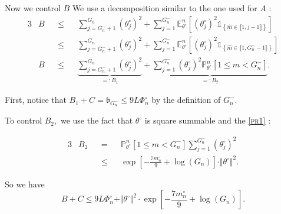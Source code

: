 Now we control $B$ We use a decomposition similar to the one used for $A$ :
\begin{alignat*}{3}
& B && \leq && \sum\limits_{j = G_{n}^{-} + 1}^{G_{n}} \left(\theta^{\circ}_{j}\right)^{2} + \sum\limits_{j = 1}^{G_{n}^{-}} \mathds{E}_{\theta^{\circ}}^{n}\left[\left(\theta^{\circ}_{j}\right)^{2} \mathds{1}_{\left\{\widehat{m} \in \llbracket 1, j - 1 \rrbracket\right\}}\right]\\
& && \leq && \sum\limits_{j = G_{n}^{-} + 1}^{G_{n}} \left(\theta^{\circ}_{j} \right)^{2} + \sum\limits_{j = 1}^{G_{n}^{-}} \mathds{E}_{\theta^{\circ}}^{n}\left[\left(\theta^{\circ}_{j}\right)^{2} \mathds{1}_{\left\{\widehat{m} \in \llbracket 1, G_{n}^{-} - 1 \rrbracket\right\}}\right]\\
& B && \leq && \underbrace{\sum\limits_{j = G_{n}^{-} + 1}^{G_{n}} \left(\theta^{\circ}_{j}\right)^{2}}_{=: B_{1}} + \underbrace{\sum\limits_{j = 1}^{G_{n}^{-}} \left(\theta^{\circ}_{j}\right)^{2} \mathds{P}_{\theta^{\circ}}^{n}\left[1 \leq \widehat{m} < G_{n}^{-}\right]}_{=: B_{2}}.
\end{alignat*}

\medskip

First, notice that $B_{1} + C = \mathfrak{b}_{G_{n}^{-}} \leq 9 L \Phi_{n}^{\circ}$ by the definition of $G_{n}^{-}.$

\medskip

To control $B_{2},$ we use the fact that $\theta^{\circ}$ is square summable and the \textsc{\cref{pr1}} :
 
\begin{alignat*}{3}
& B_{2} &&=&& \mathds{P}_{\theta^{\circ}}^{n}\left[1 \leq \widehat{m} < G_{n}^{-}\right] \sum\limits_{j = 1}^{G_{n}^{-}} \left(\theta^{\circ}_{j}\right)^{2} \\
& &&\leq&& \exp\left[-\frac{7 m_{n}^{\circ}}{9} + \log\left(G_{n}\right)\right] \cdot \Vert \theta^{\circ} \Vert^{2}.
 \end{alignat*}

\medskip

So we have
\[B + C \leq 9 L \Phi_{n}^{\circ} + \Vert \theta^{\circ} \Vert^{2} \cdot \exp\left[-\frac{7 m_{n}^{\circ}}{9} + \log\left(G_{n}\right)\right].\]

